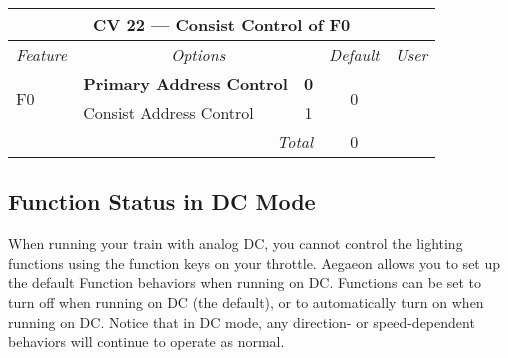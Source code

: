 \documentclass[12pt,letterpaper,draft]{memoir} %
\begin{document}
\label{CV22}
\begin{center}
\begin{tabular}{|l|lc|c|c|}
\hline
\multicolumn{5}{|c|}{\textbf{CV 22 --- Consist Control of F0}} \\ \hline \hline
\textit{Feature} & \multicolumn{2}{c|}{\textit{Options}} & \textit{Default} & \textit{User} \\ \hline
\multirow{2}{*}{F0} & \textbf{Primary Address Control} & \textbf{0}	& 	\multirow{2}{*}{0}& \\
                           & Consist Address Control & 1 & & \\ \hline\hline
\multicolumn{3}{|r|}{\textit{Total}} & 0 &\\ \hline
\end{tabular}
\end{center}

\subsection{Function Status in DC Mode}

When running your train with analog DC, you cannot control the lighting functions using the function keys on your throttle. Aegaeon allows you to set up the default Function behaviors when running on DC. Functions can be set to turn off when running on DC (the default), or to automatically turn on when running on DC. Notice that in DC mode, any direction- or speed-dependent behaviors will continue to operate as normal.
\end{document}

